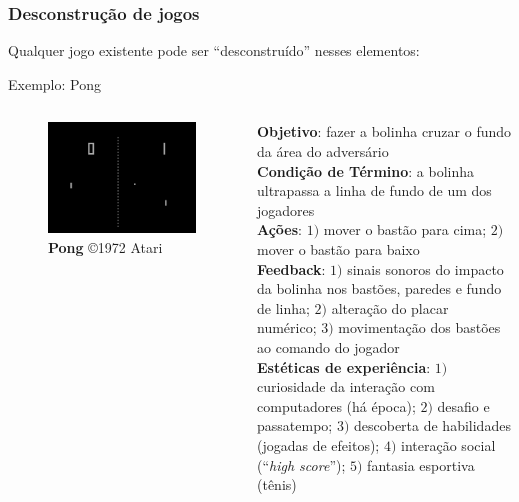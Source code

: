 \expandafter\documentclass\expandafter[table, usenames, svgnames, dvipsnames, \classopts]{beamer}
\begin{document}
\begin{frame}
	\frametitle{\textbf{Desconstrução de jogos}}

	Qualquer jogo existente pode ser ``desconstruído'' nesses elementos:

	\begin{block}{Exemplo: Pong}
	
		\begin{columns}[c]
			
			
				\begin{figure}
					\centering
					\includegraphics[height=0.2\paperheight]{pong-screenshot}
					\caption{\scriptsize\textbf{Pong} \copyright{1972} Atari\footnotemark{}}
				\end{figure}
				
			
				{\scriptsize
					\textbf{Objetivo}: fazer a bolinha cruzar o fundo da área do adversário\\
					\textbf{Condição de Término}: a bolinha ultrapassa a linha de fundo de um dos jogadores\\
					\textbf{Ações}: $1)$ mover o bastão para cima; $2)$ mover o bastão para baixo\\
					\textbf{Feedback}: $1)$ sinais sonoros do impacto da bolinha nos bastões, paredes e fundo de linha; $2)$ alteração do placar numérico; $3)$ movimentação dos bastões ao comando do jogador\\
					\textbf{Estéticas de experiência}: $1)$ curiosidade da interação com computadores (há época); $2)$ desafio e passatempo; $3)$ descoberta de habilidades (jogadas de efeitos); $4)$ interação social (``\textit{high score}''); $5)$ fantasia esportiva (tênis)
				}
			
		\end{columns}

	\end{block}	
	
	
\end{frame}
\end{document}
